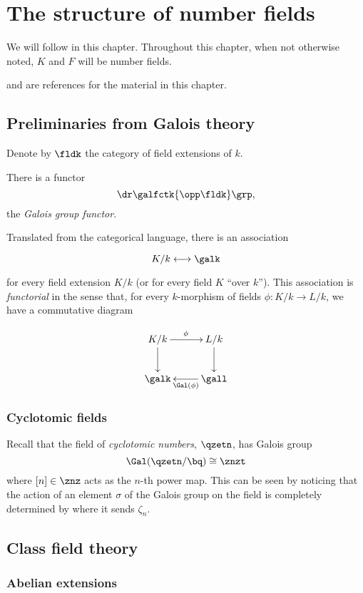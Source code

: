 \chapter{The structure of number fields}

We will follow \cite{frenkel} in this chapter. Throughout this chapter, when not
otherwise noted, $K$ and $F$ will be number fields.

\cite{kks1} and \cite{kks2} are references for the material in this chapter.

\section{Preliminaries from Galois theory}
Denote by $\fldk$ the category of field extensions of $k$.

\begin{thm}
  There is a functor
  \[\dr \galfctk {\opp\fldk} \grp,\]
  the \textit{Galois group functor}.
\end{thm}

Translated from the categorical language, there is an association

\[ K/k \longleftrightarrow \galk \]

for every field extension $K/k$ (or for every field $K$ ``over $k$''). This
association is \textit{functorial} in the sense that, for every $k$-morphism of
fields $\phi: K/k \to L/k$, we have a commutative diagram

\[
  \xymatrix{
    K/k   \ar[d] \ar[r]^\phi &L/k \ar[d]\\
    \galk &\gall \ar[l]^{\Gal(\phi)}   }
\]

\subsection{Cyclotomic fields}

Recall that the field of \textit{cyclotomic numbers}, $\qzetn$, has Galois
group
\[\Gal(\qzetn/\bq) \cong \znzt \]
where $[n]\in\znz$ acts as the $n$-th power map. This can be seen by noticing
that the action of an element $\sigma$ of the Galois group on the field is completely
determined by where it sends $\zeta_n$.

\section{Class field theory}

\subsection{Abelian extensions}

